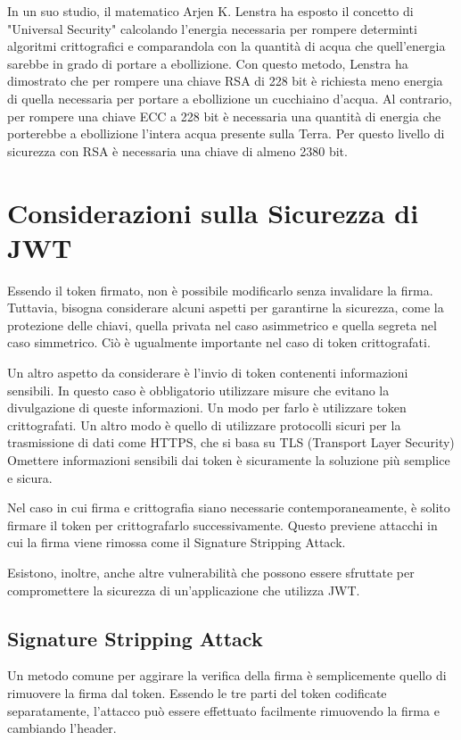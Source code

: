 \documentclass{article}
\begin{document}
In un suo studio, il matematico Arjen K. Lenstra ha esposto il concetto di "Universal Security" calcolando l'energia necessaria per rompere determinti algoritmi crittografici e comparandola con la quantità di acqua che quell'energia sarebbe in grado di portare a ebollizione.
Con questo metodo, Lenstra ha dimostrato che per rompere una chiave RSA di 228 bit è richiesta meno energia di quella necessaria per portare a ebollizione un cucchiaino d'acqua.
Al contrario, per rompere una chiave ECC a 228 bit è necessaria una quantità di energia che porterebbe a ebollizione l'intera acqua presente sulla Terra.
Per questo livello di sicurezza con RSA è necessaria una chiave di almeno 2380 bit.

\section{Considerazioni sulla Sicurezza di JWT}
Essendo il token firmato, non è possibile modificarlo senza invalidare la firma.
Tuttavia, bisogna considerare alcuni aspetti per garantirne la sicurezza, come la protezione delle chiavi, quella privata nel caso asimmetrico e quella segreta nel caso simmetrico.
Ciò è ugualmente importante nel caso di token crittografati.

Un altro aspetto da considerare è l'invio di token contenenti informazioni sensibili.
In questo caso è obbligatorio utilizzare misure che evitano la divulgazione di queste informazioni.
Un modo per farlo è utilizzare token crittografati.
Un altro modo è quello di utilizzare protocolli sicuri per la trasmissione di dati come HTTPS, che si basa su TLS (Transport Layer Security)
Omettere informazioni sensibili dai token è sicuramente la soluzione più semplice e sicura.

Nel caso in cui firma e crittografia siano necessarie contemporaneamente, è solito firmare il token per crittografarlo successivamente.
Questo previene attacchi in cui la firma viene rimossa come il Signature Stripping Attack.

Esistono, inoltre, anche altre vulnerabilità che possono essere sfruttate per compromettere la sicurezza di un'applicazione che utilizza JWT.

\subsection{Signature Stripping Attack}
Un metodo comune per aggirare la verifica della firma è semplicemente quello di rimuovere la firma dal token.
Essendo le tre parti del token codificate separatamente, l'attacco può essere effettuato facilmente rimuovendo la firma e cambiando l'header.
\end{document}
